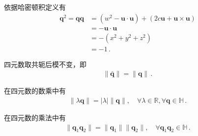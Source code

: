 \begin{prove}
    依据哈密顿积定义有
    \begin{align}
        {\bm q}^2={\bm q}{\bm q} & =(w^2-{\bm u}\cdot{\bm u})+(2c{\bm u}+{\bm u}\times{\bm u})\nonumber \\
                                 & =-{\bm u}\cdot{\bm u}\nonumber                                       \\
                                 & =-(x^2+y^2+z^2)\nonumber                                             \\
                                 & =-1\, .
    \end{align}
\end{prove}
\begin{proposition}
    四元数取共轭后模不变，即
    \begin{align}
        \|\bar{\bm q}\|=\|{\bm q}\|\, .
    \end{align}
\end{proposition}
\begin{proposition}
    在四元数的数乘中有
    \begin{align}
        \|\lambda{\bm q}\|=|\lambda|\|{\bm q}\|, \quad \forall \lambda\in\mathbb{R}, \forall {\bm q}\in\mathbb{H}\, .
    \end{align}
\end{proposition}
\begin{proposition}
    在四元数的乘法中有
    \begin{align}
        \|{\bm q}_1{\bm q}_2\|=\|{\bm q}_1\|\|{\bm q}_2\|,\quad \forall {\bm q}_1{\bm q}_2\in\mathbb{H}\, .
    \end{align}
\end{proposition}
